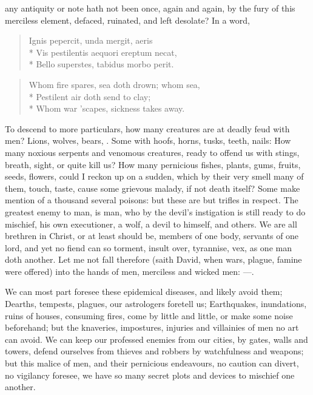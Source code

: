 {any antiquity or note hath not been once, again and again, by the fury
of this merciless element, defaced, ruinated, and left desolate? In a
word,
%
\begin{verse}
\textlatin{Ignis pepercit, unda mergit, aeris}\\*
\textlatin{Vis pestilentis aequori ereptum necat,}\\*
\textlatin{Bello superstes, tabidus morbo perit.}
\end{verse}
\translationrule
\begin{verse}
Whom fire spares, sea doth drown; whom sea,\\*
Pestilent air doth send to clay;\\*
Whom war 'scapes, sickness takes away.
\end{verse}

To descend to more particulars, how many creatures are at deadly feud
with men? Lions, wolves, bears, \etc{}. Some with hoofs, horns, tusks,
teeth, nails: How many noxious serpents and venomous creatures, ready
to offend us with stings, breath, sight, or quite kill us? How many
pernicious fishes, plants, gums, fruits, seeds, flowers, \etc{} could I
reckon up on a sudden, which by their very smell many of them, touch,
taste, cause some grievous malady, if not death itself? Some make
mention of a thousand several poisons: but these are but trifles in
respect. The greatest enemy to man, is man, who by the devil's
instigation is still ready to do mischief, his own executioner, a wolf,
a devil to himself, and others. We are all brethren in Christ, or
at least should be, members of one body, servants of one lord, and yet
no fiend can so torment, insult over, tyrannise, vex, as one man doth
another. Let me not fall therefore (saith David, when wars, plague,
famine were offered) into the hands of men, merciless and wicked men:
---.

We can most part foresee these epidemical diseases, and likely avoid
them; Dearths, tempests, plagues, our astrologers foretell us;
Earthquakes, inundations, ruins of houses, consuming fires, come by
little and little, or make some noise beforehand; but the knaveries,
impostures, injuries and villainies of men no art can avoid. We can
keep our professed enemies from our cities, by gates, walls and towers,
defend ourselves from thieves and robbers by watchfulness and weapons;
but this malice of men, and their pernicious endeavours, no caution can
divert, no vigilancy foresee, we have so many secret plots and devices
to mischief one another.

}
